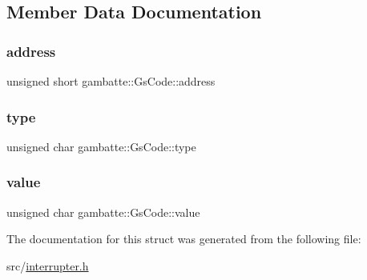 \subsection{Member Data Documentation}
\mbox{\label{structgambatte_1_1GsCode_abb512ac03eb8c6c52eff2a381985e473}} 
\subsubsection{\texorpdfstring{address}{address}}
{\footnotesize\ttfamily unsigned short gambatte\+::\+Gs\+Code\+::address}

\mbox{\label{structgambatte_1_1GsCode_a574a861f9ac283a249062ebc83c3ff15}} 
\subsubsection{\texorpdfstring{type}{type}}
{\footnotesize\ttfamily unsigned char gambatte\+::\+Gs\+Code\+::type}

\mbox{\label{structgambatte_1_1GsCode_abf832b3418728ddd0c32d1db180c508e}} 
\subsubsection{\texorpdfstring{value}{value}}
{\footnotesize\ttfamily unsigned char gambatte\+::\+Gs\+Code\+::value}



The documentation for this struct was generated from the following file\+:\begin{DoxyCompactItemize}
\item 
src/\hyperlink{interrupter_8h}{interrupter.\+h}\end{DoxyCompactItemize}
